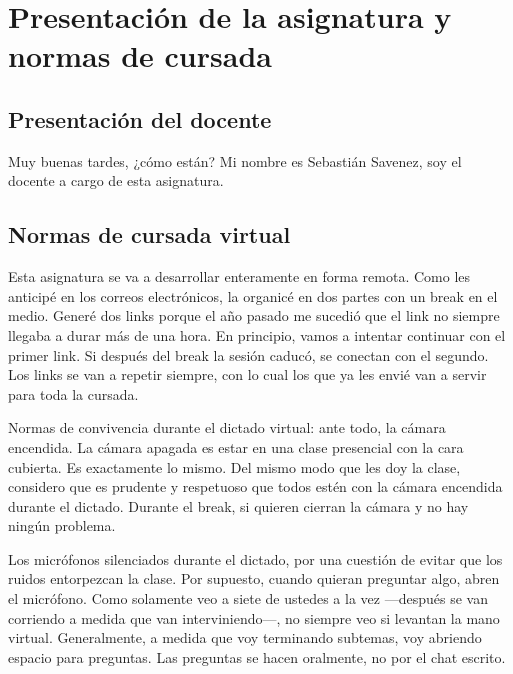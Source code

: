 \documentclass[12pt,oneside]{book}
\begin{document}

\tableofcontents

\clearpage


\chapter{Presentación de la asignatura y normas de cursada}
\label{chap:presentacion}

\section{Presentación del docente}
\label{sec:presentacion-docente}

Muy buenas tardes, ¿cómo están? Mi nombre es Sebastián Savenez, soy el docente a cargo de esta asignatura.

\section{Normas de cursada virtual}
\label{sec:normas-cursada}

Esta asignatura se va a desarrollar enteramente en forma remota. Como les anticipé en los correos electrónicos, la organicé en dos partes con un break en el medio. Generé dos links porque el año pasado me sucedió que el link no siempre llegaba a durar más de una hora. En principio, vamos a intentar continuar con el primer link. Si después del break la sesión caducó, se conectan con el segundo. Los links se van a repetir siempre, con lo cual los que ya les envié van a servir para toda la cursada.

Normas de convivencia durante el dictado virtual: ante todo, la cámara encendida. La cámara apagada es estar en una clase presencial con la cara cubierta. Es exactamente lo mismo. Del mismo modo que les doy la clase, considero que es prudente y respetuoso que todos estén con la cámara encendida durante el dictado. Durante el break, si quieren cierran la cámara y no hay ningún problema.

Los micrófonos silenciados durante el dictado, por una cuestión de evitar que los ruidos entorpezcan la clase. Por supuesto, cuando quieran preguntar algo, abren el micrófono. Como solamente veo a siete de ustedes a la vez ---después se van corriendo a medida que van interviniendo---, no siempre veo si levantan la mano virtual. Generalmente, a medida que voy terminando subtemas, voy abriendo espacio para preguntas. Las preguntas se hacen oralmente, no por el chat escrito.
\end{document}

